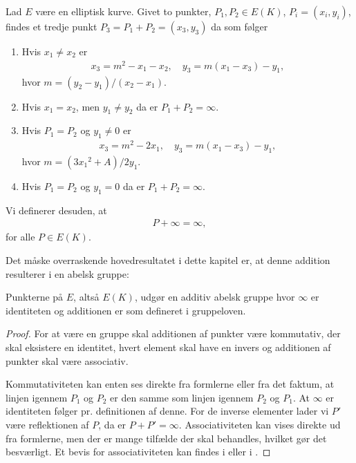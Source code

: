 \begin{definition}[Gruppeloven]
\label{gruppeloven:definitionen}
Lad $E$ være en elliptisk kurve. Givet to punkter, $P_1, P_2 \in E(K)$, $P_i = (x_i, y_i)$, findes et tredje punkt $P_3 = P_1 + P_2 = (x_3, y_3)$ da som følger
\begin{enumerate}
	\item Hvis $x_1 \neq x_2$ er 
	\begin{align*}
		x_3 = m^2 - x_1 - x_2, \quad y_3 = m(x_1 - x_3) - y_1,
	\end{align*}		
	hvor $m = (y_2 - y_1)/(x_2 - x_1)$.
	\item Hvis $x_1 = x_2$, men $y_1 \neq y_2$ da er $P_1 + P_2 = \infty$.
	\item Hvis $P_1 = P_2$ og $y_1 \neq 0$ er 
	\begin{align*}
		x_3 = m^2 - 2x_1, \quad y_3=m(x_1 - x_3) - y_1,
	\end{align*}
	hvor $m=(3{x_1}^2 + A)/2y_1$.
	\item Hvis $P_1 = P_2$ og $y_1 = 0$ da er $P_1 + P_2 = \infty$.
\end{enumerate}
Vi definerer desuden, at 
\begin{align*}
	P + \infty = \infty,
\end{align*}
for alle $P \in E(K)$.
\end{definition}
Det måske overraskende hovedresultatet i dette kapitel er, at denne addition resulterer i en abelsk gruppe:

\begin{thm}
Punkterne på $E$, altså $E(K)$, udgør en additiv abelsk gruppe hvor $\infty$ er identiteten og additionen er som defineret i gruppeloven. 
\end{thm}
\begin{proof}
For at være en gruppe skal additionen af punkter være kommutativ, der skal eksistere en identitet, hvert element skal have en invers og additionen af punkter skal være associativ.

Kommutativiteten kan enten ses direkte fra formlerne eller fra det faktum, at linjen igennem $P_1$ og $P_2$ er den samme som linjen igennem $P_2$ og $P_1$. At $\infty$ er identiteten følger pr. definitionen af denne. For de inverse elementer lader vi $P'$ være reflektionen af $P$, da er $P+P' = \infty$. Associativiteten kan vises direkte ud fra formlerne, men der er mange tilfælde der skal behandles, hvilket gør det besværligt. Et bevis for associativiteten kan findes i \cite[afsnit~2.4]{Washington} eller i \cite{Silverman}.
\end{proof}